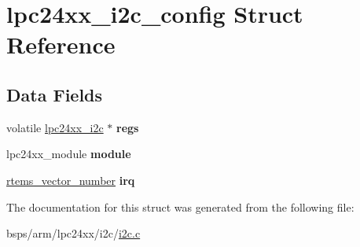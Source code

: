 \hypertarget{structlpc24xx__i2c__config}{}\section{lpc24xx\+\_\+i2c\+\_\+config Struct Reference}
\label{structlpc24xx__i2c__config}
\subsection*{Data Fields}
\begin{DoxyCompactItemize}
\item 
\mbox{\label{structlpc24xx__i2c__config_a89a626047dc66fc6daf656f697611eb3}} 
volatile \mbox{\hyperlink{structlpc24xx__i2c}{lpc24xx\+\_\+i2c}} $\ast$ {\bfseries regs}
\item 
\mbox{\label{structlpc24xx__i2c__config_a11147111b0b8ec60fe5a74b646f9896b}} 
lpc24xx\+\_\+module {\bfseries module}
\item 
\mbox{\label{structlpc24xx__i2c__config_a2dea1b9ca36532485fbb95a2fbfbdef3}} 
\mbox{\hyperlink{group__ClassicINTR_ga3e434c197d99f128e78cae4d9358bd8b}{rtems\+\_\+vector\+\_\+number}} {\bfseries irq}
\end{DoxyCompactItemize}


The documentation for this struct was generated from the following file\+:\begin{DoxyCompactItemize}
\item 
bsps/arm/lpc24xx/i2c/\mbox{\hyperlink{arm_2lpc24xx_2i2c_2i2c_8c}{i2c.\+c}}\end{DoxyCompactItemize}
